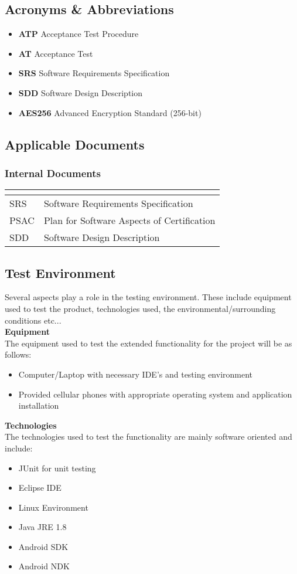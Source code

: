 \documentclass[11pt]{article}
\begin{document}
\subsection{Acronyms \& Abbreviations}
\begin{itemize}
\item \textbf{ATP} Acceptance Test Procedure
\item \textbf{AT} Acceptance Test
\item \textbf{SRS} Software Requirements Specification
\item \textbf{SDD} Software Design Description
\item \textbf{AES256} Advanced Encryption Standard (256-bit)
\end{itemize}
\subsection{Applicable Documents}
\subsubsection{Internal Documents}
\begin{tabular}{ll}
\textbf{}       & \textbf{}  \\ \hline
\multicolumn{1}{|L{2cm}|}{SRS} & \multicolumn{1}{L{10cm}|}{Software Requirements Specification} \\ \hline
\multicolumn{1}{|L{2cm}|}{PSAC} & \multicolumn{1}{L{10cm}|}{Plan for Software Aspects of Certification} \\ \hline
\multicolumn{1}{|L{2cm}|}{SDD} & \multicolumn{1}{L{10cm}|}{Software Design Description} \\ \hline
\end{tabular}

\subsection{Test Environment}
Several aspects play a role in the testing environment. These include equipment used to test the product, technologies used, the environmental/surrounding conditions etc...\\
\textbf{Equipment}\\
The equipment used to test the extended functionality for the project will be as follows:
\begin{itemize}
\item Computer/Laptop with necessary IDE's and testing environment
\item Provided cellular phones with appropriate operating system and application installation
\end{itemize}
\textbf{Technologies}\\
The technologies used to test the functionality are mainly software oriented and include:
\begin{itemize}
\item JUnit for unit testing
\item Eclipse IDE
\item Linux Environment
\item Java JRE 1.8
\item Android SDK
\item Android NDK
\end{itemize}
\end{document}
